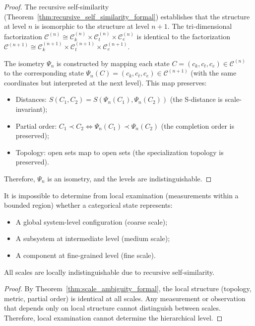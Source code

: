 \begin{proof}
The recursive self-similarity (Theorem~\ref{thm:recursive_self_similarity_formal}) establishes that the structure at level $n$ is isomorphic to the structure at level $n+1$. The tri-dimensional factorization $\mathcal{C}^{(n)} \cong \mathcal{C}_k^{(n)} \times \mathcal{C}_t^{(n)} \times \mathcal{C}_e^{(n)}$ is identical to the factorization $\mathcal{C}^{(n+1)} \cong \mathcal{C}_k^{(n+1)} \times \mathcal{C}_t^{(n+1)} \times \mathcal{C}_e^{(n+1)}$.

The isometry $\Psi_n$ is constructed by mapping each state $C = (c_k, c_t, c_e) \in \mathcal{C}^{(n)}$ to the corresponding state $\Psi_n(C) = (c_k, c_t, c_e) \in \mathcal{C}^{(n+1)}$ (with the same coordinates but interpreted at the next level). This map preserves:
\begin{itemize}
    \item Distances: $S(C_1, C_2) = S(\Psi_n(C_1), \Psi_n(C_2))$ (the S-distance is scale-invariant);
    \item Partial order: $C_1 \prec C_2 \iff \Psi_n(C_1) \prec \Psi_n(C_2)$ (the completion order is preserved);
    \item Topology: open sets map to open sets (the specialization topology is preserved).
\end{itemize}

Therefore, $\Psi_n$ is an isometry, and the levels are indistinguishable.
\end{proof}

\begin{corollary}
\label{cor:local_global_formal}
It is impossible to determine from local examination (measurements within a bounded region) whether a categorical state represents:
\begin{itemize}
    \item A global system-level configuration (coarse scale);
    \item A subsystem at intermediate level (medium scale);
    \item A component at fine-grained level (fine scale).
\end{itemize}

All scales are locally indistinguishable due to recursive self-similarity.
\end{corollary}

\begin{proof}
By Theorem~\ref{thm:scale_ambiguity_formal}, the local structure (topology, metric, partial order) is identical at all scales. Any measurement or observation that depends only on local structure cannot distinguish between scales. Therefore, local examination cannot determine the hierarchical level.
\end{proof}

